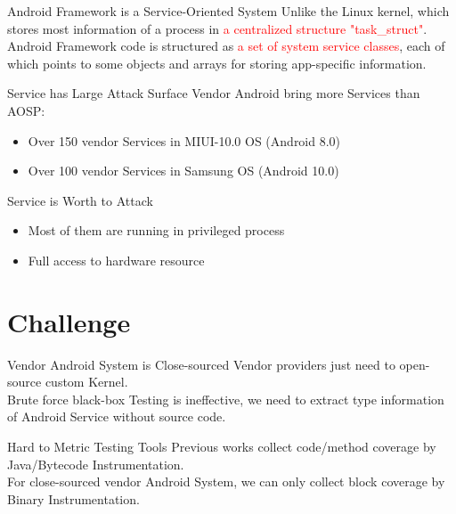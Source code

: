 \documentclass[notheorems, aspectratio=54]{beamer}
\begin{document}
\begin{frame}

    \begin{block}{Android Framework is a Service-Oriented System}
     	Unlike the Linux kernel, which stores most information of a process in \textcolor{red}{a centralized structure "task\_struct"}. 
     	\\[2ex]
     	Android Framework code is structured as \textcolor{red}{a set of system service classes}, each of which points to some objects and arrays for storing app-specific information.
    \end{block}

	\begin{block}{Service has Large Attack Surface}
		Vendor Android bring more Services than AOSP:
		\begin{itemize}
			\item Over 150 vendor Services in MIUI-10.0 OS (Android 8.0)
			\item Over 100 vendor Services in Samsung OS (Android 10.0)
		\end{itemize}
	\end{block}

	\begin{block}{Service is Worth to Attack}
		\begin{itemize}
			\item Most of them are running in privileged process
			\item Full access to hardware resource
		\end{itemize}
	\end{block}

\end{frame}

\section{Challenge}

\begin{frame}
	\begin{block}{Vendor Android System is Close-sourced}
		 Vendor providers just need to open-source custom Kernel.
		 \\[1ex]
		 Brute force black-box Testing is ineffective, we need to extract type information of Android Service without source code.
	\end{block}

	\begin{block}{Hard to Metric Testing Tools}
		Previous works collect code/method coverage by Java/Bytecode Instrumentation. 
		\\[1ex]
		For close-sourced vendor Android System, we can only collect block coverage by Binary Instrumentation.
	\end{block}
\end{frame}
\end{document}
